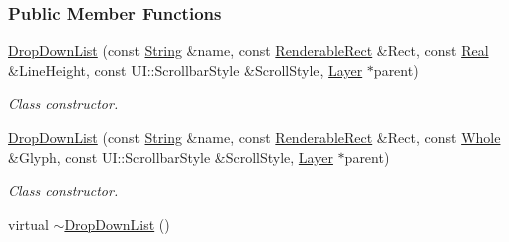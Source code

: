 \subsubsection*{Public Member Functions}
\begin{DoxyCompactItemize}
\item 
\hyperlink{classphys_1_1UI_1_1DropDownList_a4646bc366b489a131747ea01629af428}{DropDownList} (const \hyperlink{namespacephys_aa03900411993de7fbfec4789bc1d392e}{String} \&name, const \hyperlink{structphys_1_1UI_1_1RenderableRect}{RenderableRect} \&Rect, const \hyperlink{namespacephys_af7eb897198d265b8e868f45240230d5f}{Real} \&LineHeight, const UI::ScrollbarStyle \&ScrollStyle, \hyperlink{classphys_1_1UI_1_1Layer}{Layer} $\ast$parent)
\begin{DoxyCompactList}\small\item\em Class constructor. \item\end{DoxyCompactList}\item 
\hyperlink{classphys_1_1UI_1_1DropDownList_a9868ebcc629cf6b43a3913be5358e0b8}{DropDownList} (const \hyperlink{namespacephys_aa03900411993de7fbfec4789bc1d392e}{String} \&name, const \hyperlink{structphys_1_1UI_1_1RenderableRect}{RenderableRect} \&Rect, const \hyperlink{namespacephys_a460f6bc24c8dd347b05e0366ae34f34a}{Whole} \&Glyph, const UI::ScrollbarStyle \&ScrollStyle, \hyperlink{classphys_1_1UI_1_1Layer}{Layer} $\ast$parent)
\begin{DoxyCompactList}\small\item\em Class constructor. \item\end{DoxyCompactList}\item 
\hypertarget{classphys_1_1UI_1_1DropDownList_abef8eec322f0e2a6af99aac6bfc3a6eb}{
virtual \hyperlink{classphys_1_1UI_1_1DropDownList_abef8eec322f0e2a6af99aac6bfc3a6eb}{$\sim$DropDownList} ()}
\label{classphys_1_1UI_1_1DropDownList_abef8eec322f0e2a6af99aac6bfc3a6eb}


\end{DoxyCompactItemize}
